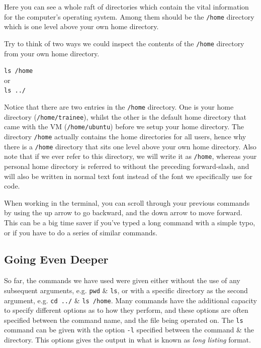 \documentclass[a4paper,12pt,twoside]{memoir}
\begin{document}
Here you can see a whole raft of directories which contain the vital information for the computer's operating system.
Among them should be the \texttt{/home} directory which is one level above your own home directory. \\

\begin{questions}
 Try to think of two ways we could inspect the contents of the \texttt{/home} directory from your own home directory. \\
\begin{answer}
\texttt{ls /home} \\
or \\
\texttt{ls ../} \\
\end{answer}
\end{questions}

\begin{note}
Notice that there are two entries in the \texttt{/home} directory. 
One is your home directory (\texttt{/home/trainee}), whilst the other is the default home directory that came with the VM (\texttt{/home/ubuntu}) before we setup your home directory.
The directory \texttt{/home} actually contains the home directories for all users, hence why there is a \texttt{/home} directory that sits one level above your own home directory.
Also note that if we ever refer to this directory, we will write it as \texttt{/home}, whereas your personal home directory is referred to without the preceding forward-slash, and will also be written in normal text font instead of the font we specifically use for code. \\
\end{note}

\begin{information}
When working in the terminal, you can scroll through your previous commands by using the up arrow to go backward, and the down arrow to move forward.
This can be a big time saver if you've typed a long command with a simple typo, or if you have to do a series of similar commands.
\end{information}

\subsection{Going Even Deeper}
\begin{information}
So far, the commands we have used were given either without the use of any subsequent arguments, e.g. \texttt{pwd} \& \texttt{ls}, or with a specific directory as the second argument, e.g. \texttt{cd ../} \& \texttt{ls /home}.
Many commands have the additional capacity to specify different options as to how they perform, and these options are often specified between the command name, and the file being operated on.
The \texttt{ls} command can be given with the option \texttt{-l} specified between the command \& the directory.
This options gives the output in what is known as \textit{long listing} format. \\
\end{information}
\end{document}

